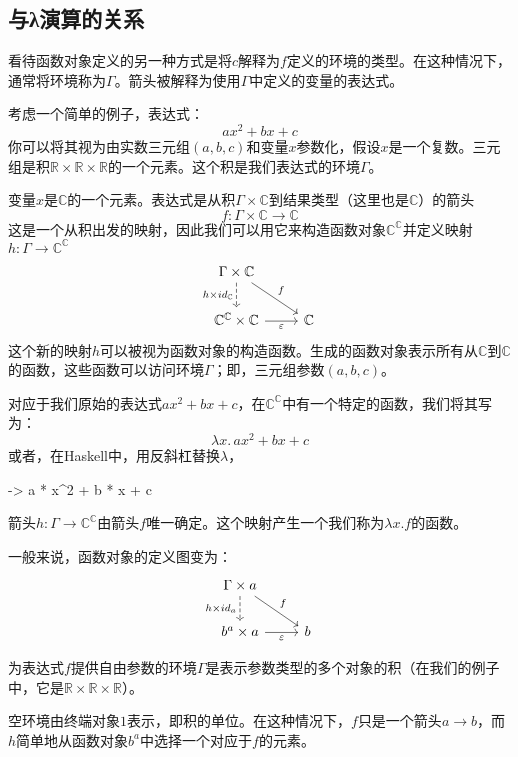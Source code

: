 \documentclass[DaoFP]{subfiles}
\begin{document}
\subsection{与λ演算的关系}

看待函数对象定义的另一种方式是将$c$解释为$f$定义的环境的类型。在这种情况下，通常将环境称为$\Gamma$。箭头被解释为使用$\Gamma$中定义的变量的表达式。

考虑一个简单的例子，表达式：
\[a x^2 + b x + c\]
你可以将其视为由实数三元组$(a, b, c)$和变量$x$参数化，假设$x$是一个复数。三元组是积$\mathbb{R} \times \mathbb{R} \times \mathbb{R}$的一个元素。这个积是我们表达式的环境$\Gamma$。

变量$x$是$\mathbb{C}$的一个元素。表达式是从积$\Gamma \times \mathbb{C}$到结果类型（这里也是$\mathbb{C}$）的箭头
\[f \colon \Gamma \times \mathbb{C} \to \mathbb{C} \]
这是一个从积出发的映射，因此我们可以用它来构造函数对象$\mathbb{C}^{\mathbb{C}}$并定义映射$h \colon \Gamma \to \mathbb{C}^{\mathbb{C}}$
\[
 \begin{tikzcd}
 \Gamma \times \mathbb{C}
 \arrow[d, dashed, "h \times id_{\mathbb{C}}"']
 \arrow[rd, "f"]
 \\
 \mathbb{C}^{\mathbb{C}} \times \mathbb{C}
 \arrow[r, "\varepsilon"']
& \mathbb{C}
 \end{tikzcd}
\]
这个新的映射$h$可以被视为函数对象的构造函数。生成的函数对象表示所有从$\mathbb{C}$到$\mathbb{C}$的函数，这些函数可以访问环境$\Gamma$；即，三元组参数$(a, b, c)$。

对应于我们原始的表达式$a x^2 + b x + c$，在$\mathbb{C}^{\mathbb{C}}$中有一个特定的函数，我们将其写为：
\[  \lambda x . \,a x^2 + b x + c \]
或者，在Haskell中，用反斜杠替换$\lambda$，
\begin{haskell}
\x -> a * x^2 + b * x + c
\end{haskell}

箭头$h \colon \Gamma \to \mathbb{C}^{\mathbb{C}}$由箭头$f$唯一确定。这个映射产生一个我们称为$\lambda x . f$的函数。

一般来说，函数对象的定义图变为：
\[
 \begin{tikzcd}
 \Gamma \times a
 \arrow[d, dashed, "{h \times id_a}"']
 \arrow[rd, "f"]
 \\
 b^a \times a
 \arrow[r, "\varepsilon"']
& b
 \end{tikzcd}
\]

为表达式$f$提供自由参数的环境$\Gamma$是表示参数类型的多个对象的积（在我们的例子中，它是$\mathbb{R} \times \mathbb{R} \times \mathbb{R}$）。

空环境由终端对象$1$表示，即积的单位。在这种情况下，$f$只是一个箭头$a \to b$，而$h$简单地从函数对象$b^a$中选择一个对应于$f$的元素。
\end{document}
